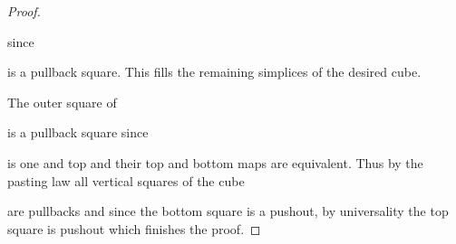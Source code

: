 \begin{lemma}
\begin{proof}
\begin{center}
        \end{center}
        since
        \begin{center}
        \end{center}
        is a pullback square.
        This fills the remaining simplices of the desired cube.

        The outer square of 
        \begin{center}
        \end{center}
        is a pullback square since 
        \begin{center}
        \end{center}
        is one and top and their top and bottom maps are equivalent.
        Thus by the pasting law all vertical squares of the cube
        \begin{center}
        \end{center}
        are pullbacks and since the bottom square is a pushout, by universality the top square is pushout which finishes the proof.
    \end{proof}
\end{lemma}
